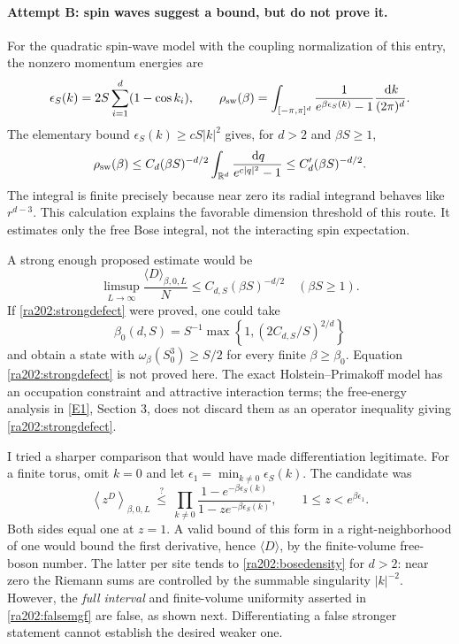 \documentclass[11pt]{article}
\newcommand{\R}{\mathbb{R}}
\newcommand{\dd}{\,\mathrm d}
\newcommand{\eref}[2]{\hyperlink{extra:#1:#2}{[E#2]}}
\begin{document}
	\paragraph{Attempt B: spin waves suggest a bound, but do not prove it.}
	For the quadratic spin-wave model with the coupling normalization of
	this entry, the nonzero momentum energies are
	\[
	\epsilon_S(k)=2S\sum_{i=1}^d(1-\cos k_i),\qquad
	\rho_{\rm sw}(\beta)=
	\int_{[-\pi,\pi]^d}\frac{1}{e^{\beta\epsilon_S(k)}-1}
	\frac{\dd k}{(2\pi)^d}.
	\]
	The elementary bound $\epsilon_S(k)\geq cS|k|^2$ gives, for $d>2$ and
	$\beta S\geq1$,
	\begin{equation}\label{ra202:bosedensity}
		\rho_{\rm sw}(\beta)
		\leq C_d(\beta S)^{-d/2}
		\int_{\R^d}\frac{\dd q}{e^{c|q|^2}-1}
		\leq C_d'(\beta S)^{-d/2}.
	\end{equation}
	The integral is finite precisely because near zero its radial
	integrand behaves like $r^{d-3}$. This calculation explains the
	favorable dimension threshold of this route. It estimates only the
	free Bose integral, not the interacting spin expectation.
	
	A strong enough proposed estimate would be
	\begin{equation}\label{ra202:strongdefect}
		\limsup_{L\to\infty}\frac{\langle D\rangle_{\beta,0,L}}{N}
		\leq C_{d,S}(\beta S)^{-d/2}
		\quad(\beta S\geq1). \tag{SD}
	\end{equation}
	If \eqref{ra202:strongdefect} were proved, one could take
	\[
	\beta_0(d,S)=S^{-1}\max\left\{1,
	(2C_{d,S}/S)^{2/d}\right\}
	\]
	and obtain a state with $\omega_\beta(S_0^3)\geq S/2$ for every finite
	$\beta\geq\beta_0$. Equation \eqref{ra202:strongdefect} is not proved
	here. The exact Holstein--Primakoff model has an occupation constraint
	and attractive interaction terms; the free-energy analysis in
	\eref{202}{1}, Section 3, does not discard them as an operator
	inequality giving \eqref{ra202:strongdefect}.
	
	I tried a sharper comparison that would have made differentiation
	legitimate. For a finite torus, omit $k=0$ and let
	$\epsilon_1=\min_{k\ne0}\epsilon_S(k)$. The candidate was
	\begin{equation}\label{ra202:falsemgf}
		\left\langle z^D\right\rangle_{\beta,0,L}
		\ \stackrel{?}{\leq}\
		\prod_{k\ne0}\frac{1-e^{-\beta\epsilon_S(k)}}
		{1-ze^{-\beta\epsilon_S(k)}},
		\qquad 1\leq z<e^{\beta\epsilon_1}.
	\end{equation}
	Both sides equal one at $z=1$. A valid bound of this form in a
	right-neighborhood of one would bound the first derivative, hence
	$\langle D\rangle$, by the finite-volume free-boson number. The latter
	per site tends to \eqref{ra202:bosedensity} for $d>2$: near zero the
	Riemann sums are controlled by the summable singularity $|k|^{-2}$.
	However, the \emph{full interval} and finite-volume uniformity asserted
	in \eqref{ra202:falsemgf} are false, as shown next. Differentiating a
	false stronger statement cannot establish the desired weaker one.
	
\end{document}
